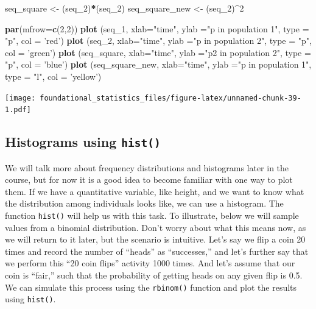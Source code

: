 \documentclass[]{book}
\newenvironment{Shaded}{\begin{snugshade}}{\end{snugshade}}
\newcommand{\DataTypeTok}[1]{\textcolor[rgb]{0.13,0.29,0.53}{#1}}
\newcommand{\DecValTok}[1]{\textcolor[rgb]{0.00,0.00,0.81}{#1}}
\newcommand{\KeywordTok}[1]{\textcolor[rgb]{0.13,0.29,0.53}{\textbf{#1}}}
\newcommand{\NormalTok}[1]{#1}
\newcommand{\OperatorTok}[1]{\textcolor[rgb]{0.81,0.36,0.00}{\textbf{#1}}}
\newcommand{\StringTok}[1]{\textcolor[rgb]{0.31,0.60,0.02}{#1}}
\begin{document}
\begin{Shaded}
\begin{Highlighting}[]
\NormalTok{seq_square <-}\StringTok{ }\NormalTok{(seq_}\DecValTok{2}\NormalTok{)}\OperatorTok{*}\NormalTok{(seq_}\DecValTok{2}\NormalTok{)}
\NormalTok{seq_square_new <-}\StringTok{ }\NormalTok{(seq_}\DecValTok{2}\NormalTok{)}\OperatorTok{^}\DecValTok{2}

\KeywordTok{par}\NormalTok{(}\DataTypeTok{mfrow=}\KeywordTok{c}\NormalTok{(}\DecValTok{2}\NormalTok{,}\DecValTok{2}\NormalTok{))}
\KeywordTok{plot}\NormalTok{ (seq_}\DecValTok{1}\NormalTok{, }\DataTypeTok{xlab=}\StringTok{"time"}\NormalTok{, }\DataTypeTok{ylab =}\StringTok{"p in population 1"}\NormalTok{, }\DataTypeTok{type =} \StringTok{"p"}\NormalTok{, }\DataTypeTok{col =} \StringTok{'red'}\NormalTok{)}
\KeywordTok{plot}\NormalTok{ (seq_}\DecValTok{2}\NormalTok{, }\DataTypeTok{xlab=}\StringTok{"time"}\NormalTok{, }\DataTypeTok{ylab =}\StringTok{"p in population 2"}\NormalTok{, }\DataTypeTok{type =} \StringTok{"p"}\NormalTok{, }\DataTypeTok{col =} \StringTok{'green'}\NormalTok{)}
\KeywordTok{plot}\NormalTok{ (seq_square, }\DataTypeTok{xlab=}\StringTok{"time"}\NormalTok{, }\DataTypeTok{ylab =}\StringTok{"p2 in population 2"}\NormalTok{, }\DataTypeTok{type =} \StringTok{"p"}\NormalTok{, }\DataTypeTok{col =} \StringTok{'blue'}\NormalTok{)}
\KeywordTok{plot}\NormalTok{ (seq_square_new, }\DataTypeTok{xlab=}\StringTok{"time"}\NormalTok{, }\DataTypeTok{ylab =}\StringTok{"p in population 1"}\NormalTok{, }\DataTypeTok{type =} \StringTok{"l"}\NormalTok{, }\DataTypeTok{col =} \StringTok{'yellow'}\NormalTok{)}
\end{Highlighting}
\end{Shaded}

\texttt{[image: foundational\_statistics\_files/figure-latex/unnamed-chunk-39-1.pdf]}

\hypertarget{histograms-using-hist}{%
\subsection{\texorpdfstring{Histograms using \texttt{hist()}}{Histograms using hist()}}\label{histograms-using-hist}}

We will talk more about frequency distributions and histograms later in the course, but for now it is a good idea to become familiar with one way to plot them. If we have a quantitative variable, like height, and we want to know what the distribution among individuals looks like, we can use a histogram. The function \texttt{hist()} will help us with this task. To illustrate, below we will sample values from a binomial distribution. Don't worry about what this means now, as we will return to it later, but the scenario is intuitive. Let's say we flip a coin 20 times and record the number of ``heads'' as ``successes,'' and let's further say that we perform this ``20 coin flips'' activity 1000 times. And let's assume that our coin is ``fair,'' such that the probability of getting heads on any given flip is 0.5. We can simulate this process using the \texttt{rbinom()} function and plot the results using \texttt{hist()}.
\end{document}
